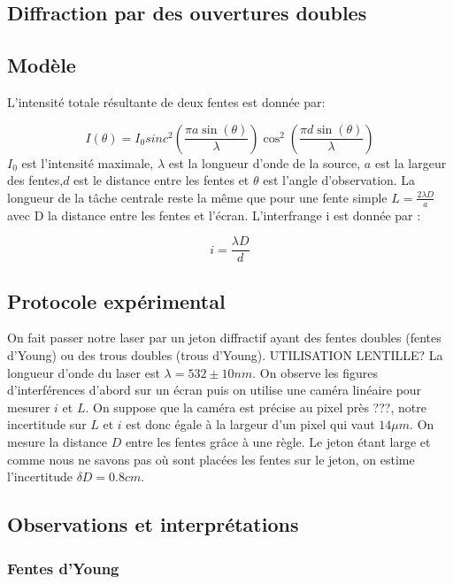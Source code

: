 \documentclass[12pt]{article}
\begin{document}
\subsection{Diffraction par des ouvertures doubles}
\subsection{Modèle}
L'intensité totale résultante de deux fentes est donnée par:

\begin{equation}
I(\theta)=I_0 sinc^2 \left(\frac{\pi a \sin(\theta)}{\lambda}\right) \cos^2 \left(\frac{\pi d \sin(\theta)}{\lambda}\right)
\label{equa:Intensité_doubles}
\end{equation}
$I_0$ est l'intensité maximale, $\lambda$ est la longueur d'onde de la source, $a$ est la largeur des fentes,$d$ est le distance entre les fentes et $\theta$ est l'angle d'observation.
La longueur de la tâche centrale reste la même que pour une fente simple $L=\frac{2 \lambda D}{a}$ avec D la distance entre les fentes et l'écran. L'interfrange i est donnée par :

\begin{equation}
    i= \frac{\lambda D}{d}
\label{equa:interfrange}
\end{equation}

\subsection{Protocole expérimental}
On fait passer notre laser par un jeton diffractif ayant des fentes doubles (fentes d'Young) ou des trous doubles (trous d'Young). UTILISATION LENTILLE? La longueur d'onde du laser est $\lambda = 532 \pm 10 nm$. On observe les figures d'interférences d'abord sur un écran puis on utilise une caméra linéaire pour mesurer $i$ et $L$. On suppose que la caméra est précise au pixel près ???, notre incertitude sur $L$ et $i$ est donc égale à la largeur d'un pixel qui vaut $14 \mu m$. On mesure la distance $D$ entre les fentes grâce à une règle. Le jeton étant large et comme nous ne savons pas où sont placées les fentes sur le jeton, on estime l'incertitude $\delta D= 0.8 cm$. 

\subsection{Observations et interprétations}


\subsubsection{Fentes d'Young}
\end{document}
